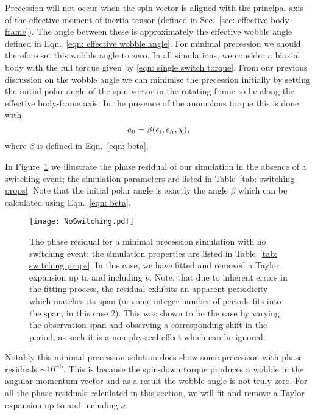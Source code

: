 \documentclass[../full_thesis/full_thesis.tex]{subfiles}
\newcommand{\thisdir}{../inertial_frame}
\begin{document}
Precession will not occur when the spin-vector is aligned with the principal
axis of the effective moment of inertia tensor (defined in Sec.~\ref{sec:
effective body frame}). The angle between these is approximately the
effective wobble angle defined in Eqn.~\eqref{eqn: effective wobble angle}.
For minimal precession we should therefore set this wobble angle to
zero. In all simulations, we consider a biaxial body with the full torque given
by \eqref{eqn: single switch torque}. From our previous discussion on the
wobble angle we can minimise the precession initially by setting the initial polar angle
of the spin-vector in the rotating frame to lie along the effective body-frame
axis. In the presence of the anomalous torque this is done with
\begin{equation}
a_{0} = \beta(\epsilon_{\mathrm{I}}, \epsilon_{\mathrm{A}}, \chi),
\end{equation}
where $\beta$ is defined in Eqn.~\ref{eqn: beta}.

In Figure~\ref{fig: no switching} we illustrate the phase residual of our
simulation in the absence of a switching event; the simulation parameters are
listed in Table~\ref{tab: switching props}. Note that the initial polar angle
is exactly the angle $\beta$ which can be calculated using Eqn.~\eqref{eqn:
beta}.
\begin{figure}[htb]
\texttt{[image: NoSwitching.pdf]}
\caption{The phase residual for a minimal precession simulation with no
         switching event; the simulation properties are listed in
         Table~\ref{tab: switching props}. In this case, we have fitted and
         removed a Taylor expansion up to and including $\ddot{\nu}$.
         Note, that due to inherent errors in the fitting process, the residual
         exhibits an apparent periodicity which matches its span (or some integer
         number of periods fits into the span, in this case 2). This was shown
         to be the case by varying the observation span and observing a
         corresponding shift in the period, as such it is a non-physical effect
         which can be ignored.
}
\label{fig: no switching}
\end{figure}
\begin{table}[htb]
\centering

\caption{Simulation properties used for Figure~\ref{fig: no switching},
Figure~\ref{fig: switching without anom}, and Figure~\ref{fig: switching with anom}.}
\label{tab: switching props}
\end{table}

Notably this minimal precession solution does show some precession with phase
residuals $\sim 10^{-5}$. This is because the spin-down torque produces a wobble
in the angular momentum vector and as a result the wobble angle is not truly
zero. For all the phase residuals calculated in this section, we will fit and
remove a Taylor expansion up to and including $\ddot{\nu}$.
\end{document}
